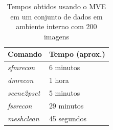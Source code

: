 \begin{table}[!h]
\centering
\caption{Tempos obtidos usando o MVE em um conjunto de dados em ambiente interno com 200 imagens}
\label{tab:galinha200mve}
\begin{tabular}{|l|l|}
\hline
Comando            & Tempo (aprox.)         \\ \hline
\emph{sfmrecon}  & 6 minutos   \\ \hline
\emph{dmrecon}   & 1 hora \\ \hline
\emph{scene2pset} & 5 minutos   \\ \hline
\emph{fssrecon}  & 29 minutos \\ \hline
\emph{meshclean} & 45 segundos    \\ \hline
\end{tabular}
\end{table}






